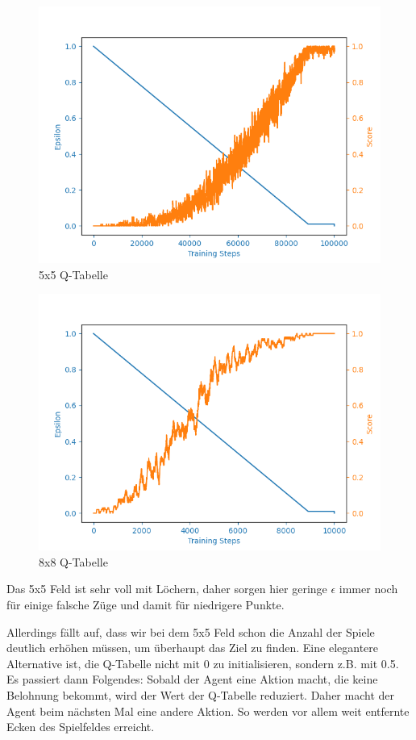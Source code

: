 \begin{figure}[H]
\centering
\includegraphics[width=\textwidth]{Figures/q_table_5x5.png}
\caption{5x5 Q-Tabelle}
\label{q2}
\end{figure}

\begin{figure}[H]
\centering
\includegraphics[width=\textwidth]{Figures/q_table_8x8.png}
\caption{8x8 Q-Tabelle}
\label{q3}
\end{figure}

Das 5x5 Feld ist sehr voll mit Löchern, daher sorgen hier geringe $\epsilon$ immer noch für einige falsche Züge und damit für niedrigere Punkte.

Allerdings fällt auf, dass wir bei dem 5x5 Feld schon die Anzahl der Spiele deutlich erhöhen müssen, um überhaupt das Ziel zu finden. Eine elegantere Alternative ist, die Q-Tabelle nicht mit 0 zu initialisieren, sondern z.B. mit 0.5. Es passiert dann Folgendes: Sobald der Agent eine Aktion macht, die keine Belohnung bekommt, wird der Wert der Q-Tabelle reduziert. Daher macht der Agent beim nächsten Mal eine andere Aktion. So werden vor allem weit entfernte Ecken des Spielfeldes erreicht.

